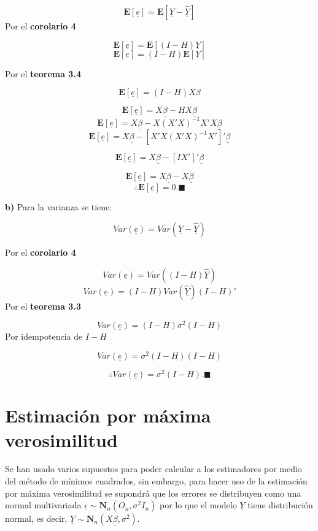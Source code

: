 \documentclass[
  a4paper,
  oneside,
  openany]{book}
\begin{document}
\[
\mathbf{E}[\underline{e}]=\mathbf{E}[\underline{Y}-\underline{\hat{Y}}]
\]
Por el \textbf{corolario 4}

\[
\mathbf{E}[\underline{e}]=\mathbf{E}[(I-H)\underline{Y}]
\]
\[
\mathbf{E}[\underline{e}]=(I-H)\mathbf{E}[\underline{Y}]
\]

Por el \textbf{teorema 3.4}

\[
\mathbf{E}[\underline{e}]=(I-H)X\beta
\]

\[
\mathbf{E}[\underline{e}]=X\underline{\beta}-HX\underline{\beta}
\]
\[
\mathbf{E}[\underline{e}]=X\underline{\beta}-X(X'X)^{-1}X'X\underline{\beta}
\]
\[
\mathbf{E}[\underline{e}]=X\underline{\beta}-\left[X'X(X'X)^{-1}X'\right]'\underline{\beta}
\]

\[
\mathbf{E}[\underline{e}]=X\underline{\beta}-[IX']'\underline{\beta}
\]

\[
\mathbf{E}[\underline{e}]=X\underline{\beta}-X\underline{\beta}
\]
\[
\therefore \mathbf{E}[\underline{e}]=0. \blacksquare
\]

\textbf{b)} Para la varianza se tiene:

\[
Var(\underline{e})=Var\left( \underline{Y}-\underline{\hat{Y}}\right)
\]

Por el \textbf{corolario 4}

\[
Var(\underline{e})=Var\left( (I-H)\underline{\hat{Y}}\right)
\]
\[
Var(\underline{e})=(I-H)Var(\underline{\hat{Y}})(I-H)'
\]
Por el \textbf{teorema 3.3}

\[
Var(\underline{e})=(I-H)\sigma^2(I-H)
\]
Por idempotencia de \(I-H\)

\[
Var(\underline{e})=\sigma^2(I-H)(I-H)
\]

\[
\therefore Var(\underline{e})=\sigma^2(I-H). \blacksquare
\]

\hypertarget{estimaciuxf3n-por-muxe1xima-verosimilitud}{%
\section{Estimación por máxima verosimilitud}\label{estimaciuxf3n-por-muxe1xima-verosimilitud}}

Se han usado varios supuestos para poder calcular a los estimadores por medio del método de mínimos cuadrados, sin embargo, para hacer uso de la estimación por máxima verosimilitud se supondrá que los errores se distribuyen como una normal multivariada \(\underline{\epsilon} \sim \mathbf{N}_{n}(O_{n},\sigma^2 I_{n})\) por lo que el modelo \(\underline{Y}\) tiene distribución normal, es decir, \(\underline{Y} \sim \mathbf{N}_n (X\underline{\beta},\sigma^2).\)
\end{document}
